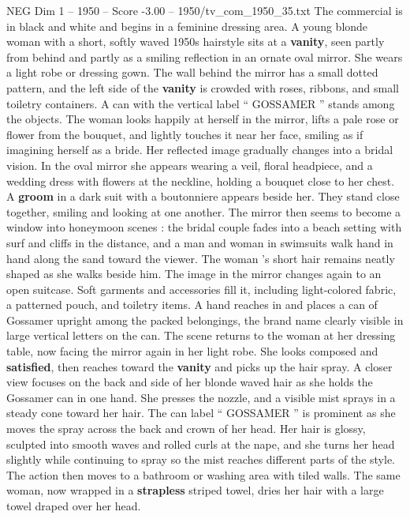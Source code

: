 \begin{textsample}{NEG Dim 1 – 1950 – Score -3.00 – 1950/tv\_com\_1950\_35.txt}  \label{ex:f1_neg_013}
The commercial is in black and white and begins in a feminine dressing area.
A young blonde woman with a short, softly waved 1950s hairstyle sits at a \textbf{vanity}, seen partly from behind and partly as a smiling reflection in an ornate oval mirror.
She wears a light robe or dressing gown.
The wall behind the mirror has a small dotted pattern, and the left side of the \textbf{vanity} is crowded with roses, ribbons, and small toiletry containers.
A can with the vertical label “ GOSSAMER ” stands among the objects.
The woman looks happily at herself in the mirror, lifts a pale rose or flower from the bouquet, and lightly touches it near her face, smiling as if imagining herself as a bride.
Her reflected image gradually changes into a bridal vision.
In the oval mirror she appears wearing a veil, floral headpiece, and a wedding dress with flowers at the neckline, holding a bouquet close to her chest.
A \textbf{groom} in a dark suit with a boutonniere appears beside her.
They stand close together, smiling and looking at one another.
The mirror then seems to become a window into honeymoon scenes : the bridal couple fades into a beach setting with surf and cliffs in the distance, and a man and woman in swimsuits walk hand in hand along the sand toward the viewer.
The woman ’s short hair remains neatly shaped as she walks beside him.
The image in the mirror changes again to an open suitcase.
Soft garments and accessories fill it, including light-colored fabric, a patterned pouch, and toiletry items.
A hand reaches in and places a can of Gossamer upright among the packed belongings, the brand name clearly visible in large vertical letters on the can.
The scene returns to the woman at her dressing table, now facing the mirror again in her light robe.
She looks composed and \textbf{satisfied}, then reaches toward the \textbf{vanity} and picks up the hair spray.
A closer view focuses on the back and side of her blonde waved hair as she holds the Gossamer can in one hand.
She presses the nozzle, and a visible mist sprays in a steady cone toward her hair.
The can label “ GOSSAMER ” is prominent as she moves the spray across the back and crown of her head.
Her hair is glossy, sculpted into smooth waves and rolled curls at the nape, and she turns her head slightly while continuing to spray so the mist reaches different parts of the style.
The action then moves to a bathroom or washing area with tiled walls.
The same woman, now wrapped in a \textbf{strapless} striped towel, dries her hair with a large towel draped over her head.

\end{textsample}
